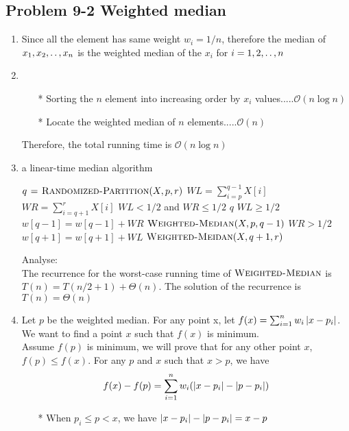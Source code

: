 \subsection*{Problem 9-2 Weighted median}
\begin{enumerate}
	\item	Since all the element has same weight $w_i = 1 / n$, therefore the median of $x_1, x_2, \mathinner{\ldotp\ldotp}, x_n$ is the weighted median of the $x_i$ for $i = 1, 2, \mathinner{\ldotp\ldotp}, n$
	\item	\begin{itemize}
			\item[*]	Sorting the $n$ element into increasing order by $x_i$ values.....$\mathcal{O}(n \log n)$
			\item[*]	Locate the weighted median of $n$ elements.....$\mathcal{O}(n)$
		\end{itemize}
		Therefore, the total running time is $\mathcal{O}(n \log n)$
	\item	a linear-time median algorithm
		\begin{codebox}
		\li	$q \mathrel{\hspace{1pt}=\hspace{1pt}} \textnormal{\scshape Randomized-Partition}(X, p, r)$
		\li	$WL = \sum_{i = p}^{q - 1} X[i]$
		\li	$WR = \sum_{i = q + 1}^{r} X[i]$
		\li	\If $WL < 1 / 2$ and $WR \leq 1 / 2$
			\Then
		\li		\Return $q$
			\End
		\li	\If $WL \geq 1 / 2$
			\Then
		\li		$w[q - 1] = w[q - 1] + WR$
		\li		\Return $\textnormal{\scshape Weighted-Median}(X, p, q - 1)$
			\End
		\li	\If $WR > 1 / 2$
			\Then
		\li		$w[q + 1] = w[q + 1] + WL$
		\li		\Return $\textnormal{\scshape Weighted-Meidan}(X, q + 1, r)$
			\End
		\end{codebox}
		Analyse: \\
		The recurrence for the worst-case running time of $\textnormal{\scshape Weighted-Median}$ is $T(n) = T(n / 2 + 1) + \Theta(n)$. The solution of the recurrence is $T(n) = \Theta(n)$
	\item	Let $p$ be the weighted median. For any point x, let $f(x) = \sum_{i = 1}^{n} w_i \left\lvert x - p_i \right\rvert$. We want to find a point $x$ such that $f(x)$ is minimum. \\
		Assume $f(p)$ is minimum, we will prove that for any other point $x$, $f(p) \leq f(x)$. For any $p$ and $x$ such that $x > p$, we have
		\begin{equation} \notag
			f(x) - f(p) = \sum_{i = 1}^n w_i(\left\lvert x - p_i \right\rvert - \left\lvert p - p_i \right\rvert)
		\end{equation}
		\begin{itemize}
			\item[*]	When $p_i \leq p < x$, we have $\left\lvert x - p_i \right\rvert - \left\lvert p - p_i \right\rvert = x - p$

\end{itemize}
\end{enumerate}
